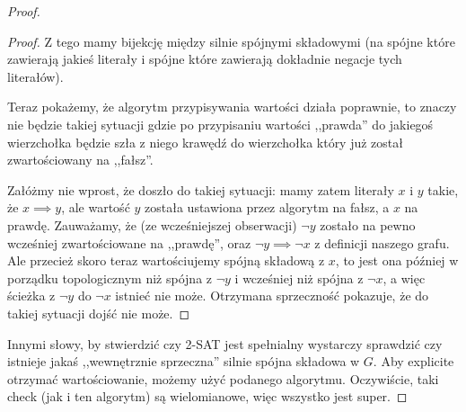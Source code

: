\begin{proof}
\begin{proof}
Z tego mamy bijekcję między silnie spójnymi składowymi (na spójne które zawierają jakieś literały i spójne które zawierają dokładnie negacje tych literałów). 

Teraz pokażemy, że algorytm przypisywania wartości działa poprawnie, to znaczy nie będzie takiej sytuacji gdzie po przypisaniu wartości ,,prawda'' do jakiegoś wierzchołka będzie szła z niego krawędź do wierzchołka który już został zwartościowany na ,,fałsz''. 

Załóżmy nie wprost, że doszło do takiej sytuacji: mamy zatem literały \(x\) i \(y\) takie, że \( x \implies y\), ale wartość \(y\) została ustawiona przez algorytm na fałsz, a \(x\) na prawdę. Zauważamy, że (ze wcześniejszej obserwacji) \(\neg y\) zostało na pewno wcześniej zwartościowane na ,,prawdę'', oraz \( \neg y \implies \neg x\) z definicji naszego grafu. Ale przecież skoro teraz wartościujemy spójną składową z \(x\), to jest ona później w porządku topologicznym niż spójna z \( \neg y\) i wcześniej niż spójna z \( \neg x\), a więc ścieżka z \( \neg y\) do \( \neg x\) istnieć nie może. Otrzymana sprzeczność pokazuje, że do takiej sytuacji dojść nie może. \end{proof}

Innymi słowy, by stwierdzić czy \textsc{2-SAT} jest spełnialny wystarczy sprawdzić czy istnieje jakaś ,,wewnętrznie sprzeczna'' silnie spójna składowa w \(G\). Aby explicite otrzymać wartościowanie, możemy użyć podanego algorytmu. Oczywiście, taki check (jak i ten algorytm) są wielomianowe, więc wszystko jest super. 

\end{proof}